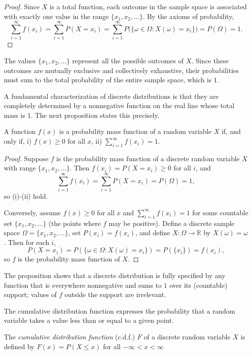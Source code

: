 \begin{proof}
Since $X$ is a total function, each outcome in the sample space is associated with exactly one value in the range $\{x_1, x_2, \ldots\}$. By the axioms of probability,
\[
\sum_{i=1}^{\infty} f(x_i)
= \sum_{i=1}^{\infty} P(X = x_i)
= \sum_{i=1}^{\infty} P\big(\{\omega \in \Omega : X(\omega) = x_i\}\big)
= P(\Omega)
= 1.
\]
\end{proof}

The values $\{x_1, x_2, \ldots\}$ represent all the possible outcomes of $X$. Since these outcomes are mutually exclusive and collectively exhaustive, their probabilities must sum to the total probability of the entire sample space, which is $1$.

A fundamental characterization of discrete distributions is that they are completely determined by a nonnegative function on the real line whose total mass is 1. The next proposition states this precisely.

\begin{proposition}
A function $f(x)$ is a probability mass function of a random variable $X$ if, and only if, i) $f(x) \geq 0$ for all $x$, ii) $\sum_{i=1}^{\infty} f(x_i) = 1$.
\end{proposition}
\begin{proof}
Suppose $f$ is the probability mass function of a discrete random variable $X$ with range $\{x_1,x_2,\ldots\}$. Then $f(x_i)=P(X=x_i)\ge 0$ for all $i$, and
\[
\sum_{i=1}^{\infty} f(x_i)=\sum_{i=1}^{\infty} P(X=x_i)=P(\Omega)=1,
\]
so (i)-(ii) hold.

Conversely, assume $f(x)\ge 0$ for all $x$ and $\sum_{i=1}^{\infty} f(x_i)=1$ for some countable set $\{x_1, x_2, \ldots\}$ (the points where $f$ may be positive). Define a discrete sample space $\Omega=\{x_1, x_2, \ldots\}$, set $P({x_i})=f(x_i)$, and define $X:\Omega\to\mathbb{R}$ by $X(\omega)=\omega$. Then for each $i$,
\[
P(X=x_i)=P(\{\omega\in\Omega:X(\omega)=x_i\})=P(\{x_i\})=f(x_i),
\]
so $f$ is the probability mass function of $X$.
\end{proof}

The proposition shows that a discrete distribution is fully specified by any function that is everywhere nonnegative and sums to $1$ over its (countable) support; values of $f$ outside the support are irrelevant.

The cumulative distribution function expresses the probability that a random variable takes a value less than or equal to a given point.

\begin{definition}
The \emph{cumulative distribution function} (c.d.f.) $F$ of a discrete random variable $X$ is defined by $F(x)=P(X\leq x)$ for all $-\infty < x < \infty$
\end{definition}

